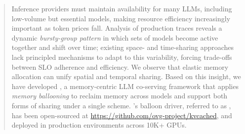 \begin{abstract}

Inference providers must maintain availability for many LLMs, including low-volume but essential models, making resource efficiency increasingly important as token prices fall. Analysis of production traces reveals a dynamic \emph{bursty-group pattern} in which sets of models become active together and shift over time; existing space- and time-sharing approaches lack principled mechanisms to adapt to this variability, forcing trade-offs between SLO adherence and efficiency. We observe that elastic memory allocation can unify spatial and temporal sharing. Based on this insight, we have developed \tool, a memory-centric LLM co-serving framework that applies \emph{memory ballooning} to reclaim memory across models and support both forms of sharing under a single scheme. \tool's balloon driver, referred to as , has been open-sourced at \url{https://github.com/ovg-project/kvcached}, and deployed in production environments across 10K+ GPUs. 

\end{abstract}